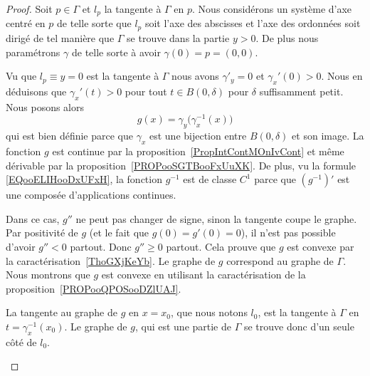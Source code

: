 \begin{proof}
	Soit \( p\in \Gamma\) et \( l_p\) la tangente à \( \Gamma\) en \( p\). Nous considérons un système d'axe centré en \( p\) de telle sorte que \( l_p\) soit l'axe des abscisses et l'axe des ordonnées soit dirigé de tel manière que \( \Gamma\) se trouve dans la partie \( y>0\). De plus nous paramétrons \( \gamma\) de telle sorte à avoir \( \gamma(0)=p=(0,0)\).

	Vu que \( l_p\equiv y=0\) est la tangente à \( \Gamma\) nous avons \( \gamma'_y=0\) et \( \gamma_x'(0)>0\). Nous en déduisons que \( \gamma_x'(t)>0\) pour tout \( t\in B(0,\delta)\) pour \( \delta\) suffisamment petit. Nous posons alors
	\begin{equation}
		g(x)=\gamma_y\big( \gamma_x^{-1}(x) \big)
	\end{equation}
	qui est bien définie parce que \( \gamma_x\) est une bijection entre \( B(0,\delta)\) et son image. La fonction \( g\) est continue par la proposition~\ref{PropIntContMOnIvCont} et même dérivable par la proposition~\ref{PROPooSGTBooFxUuXK}. De plus, vu la formule \eqref{EQooELIHooDxUFxH}, la fonction \( g^{-1}\) est de classe \( C^1\) parce que \( (g^{-1})'\) est une composée d'applications continues.

	\begin{subproof}
		\spitem[Si \( g\) est \( C^2\)]
		Dans ce cas, \( g''\) ne peut pas changer de signe, sinon la tangente coupe le graphe. Par positivité de \( g\) (et le fait que \( g(0)=g'(0)=0\)), il n'est pas possible d'avoir \( g''<0\) partout. Donc \( g''\geq 0\) partout. Cela prouve que \( g\) est convexe par la caractérisation~\ref{ThoGXjKeYb}.
		Le graphe de \( g\) correspond au graphe de \( \Gamma\). Nous montrons que \( g\) est convexe en utilisant la caractérisation de la proposition~\ref{PROPooQPOSooDZlUAJ}.

		La tangente au graphe de \( g\) en \( x=x_0\), que nous notons \( l_0\), est la tangente à \( \Gamma\) en \( t=\gamma_x^{-1}(x_0)\). Le graphe de \( g\), qui est une partie de \( \Gamma\) se trouve donc d'un seule côté de \(l_0\).


\end{subproof}
\end{proof}

